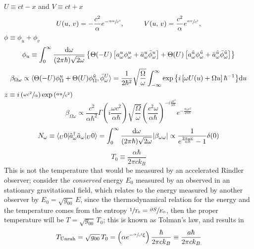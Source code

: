 $U\equiv ct-x$ and $V\equiv ct+x$
\begin{subequations}
	\begin{gather}
		U(u,\,v)=-\frac{c^2}{\alpha}e^{-\sfrac{\alpha u}{c^2}},\hspace{1.0cm} V(u,\,v)=\frac{c^2}{\alpha}e^{\sfrac{\alpha v}{c^2}},
	\end{gather}
\end{subequations}
$\phi\equiv\phi_u+\phi_v$
\begin{equation}
	\phi_u\equiv\int_0^\infty \frac{\text{d} \omega}{(2\pi\hbar)\sqrt{2\omega}}\left\{\Theta(-U)\left[a^u_\omega\phi_\omega^u+\bar a^u_\omega\bar \phi_\omega^u \right]+\Theta(U)\left[a^{\tilde u}_\omega\phi_\omega^{\tilde u}+\bar a^{\tilde u}_\omega\bar \phi_\omega^{\tilde u} \right]\right\}
\end{equation}
\begin{equation}
	\beta_{\Omega\omega}\propto \langle \Theta(-U)\phi^u_\Omega+\Theta(U)\phi^{\tilde u}_\Omega,\bar\phi_\omega^{U}\rangle=\frac{1}{2\hbar^2}\sqrt{\frac{\Omega}{\omega}}\int_{-\infty}^\infty\exp{\left\{i\left[\omega U(u)+\Omega u\right]\hbar^{-1}\right\}}\text{d} u
\end{equation}
$z\equiv i\left(\sfrac{\omega c^2}{\alpha}\right)\exp{\left(\sfrac{a u}{c^2}\right)}$
\begin{equation}
	\beta_{\Omega\omega}\propto \frac{c^2}{\alpha\hbar^2}\Gamma\left(i\frac{\omega c^2}{\alpha\hbar }\right)\sqrt{\frac{\Omega}{\omega}}\left(\frac{c^2\omega}{\alpha\hbar }\right)^{-i\frac{\omega c^2}{\alpha\hbar}}e^{-\frac{\pi\omega c^2}{2\alpha\hbar}}
\end{equation}
\begin{equation}
	N_\omega\equiv\langle_U 0|\hat{a}_\omega^\dagger\hat{a}_\omega|_U0\rangle=\int_0^\infty\frac{\text{d}\omega}{(2\pi\hbar)\sqrt{2\omega}}|\beta_{\omega\omega}|\propto\frac{1}{e^{\frac{2\pi\omega c}{\alpha\hbar}}-1}\delta(0)
\end{equation}
\begin{equation}
	T_0\equiv \frac{\alpha\hbar}{2\pi ck_B}
\end{equation}
This is not the temperature that would be measured by an accelerated Rindler observer; consider the \textit{conserved} energy $E_0$ measured by an observed in an stationary gravitational field, which relates to the energy measured by another observer by $E_0=\sqrt{g_00}\,E$, since the thermodynamical relation for the energy and the temperature comes from the entropy $\sfrac{1}{T_0}=\sfrac{\partial S}{E_0}$, then the proper temperature will be $T=\sqrt{g_{00}}\,T_0$; this is known as Tolman's law, and results in
\begin{equation}
	T_{\text{Unruh}}=\sqrt{g_{00}}\,T_0=\left(\alpha e^{-\sfrac{\alpha}{c^2}\xi}\right)\frac{\hbar}{2\pi ck_B}\equiv \frac{a\hbar}{2\pi ck_B}
\end{equation}

